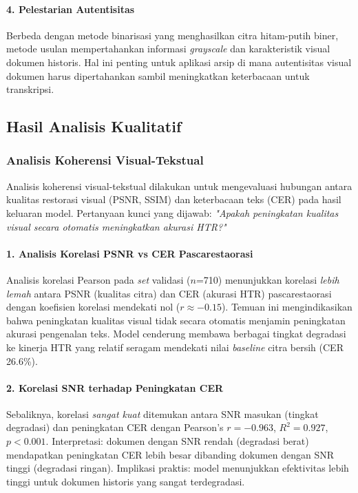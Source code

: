 \documentclass[12pt,a4paper]{article}
\begin{document}
\paragraph{4. Pelestarian Autentisitas}
Berbeda dengan metode binarisasi yang menghasilkan citra hitam-putih biner, metode usulan mempertahankan informasi \textit{grayscale} dan karakteristik visual dokumen historis. Hal ini penting untuk aplikasi arsip di mana autentisitas visual dokumen harus dipertahankan sambil meningkatkan keterbacaan untuk transkripsi.

\vspace{0.8em}

\subsection{Hasil Analisis Kualitatif}
\label{subsec:hasil-kualitatif}
\vspace{0.8em}

\subsubsection{Analisis Koherensi Visual-Tekstual}
\label{subsubsec:koherensi-visual-tekstual}

Analisis koherensi visual-tekstual dilakukan untuk mengevaluasi hubungan antara kualitas restorasi visual (PSNR, SSIM) dan keterbacaan teks (CER) pada hasil keluaran model. Pertanyaan kunci yang dijawab: \textit{"Apakah peningkatan kualitas visual secara otomatis meningkatkan akurasi HTR?"}

\paragraph{1. Analisis Korelasi PSNR vs CER Pascarestaorasi}
Analisis korelasi Pearson pada \textit{set} validasi ($n$=710) menunjukkan korelasi \textit{lebih lemah} antara PSNR (kualitas citra) dan CER (akurasi HTR) pascarestaorasi dengan koefisien korelasi mendekati nol ($r \approx -0.15$). Temuan ini mengindikasikan bahwa peningkatan kualitas visual tidak secara otomatis menjamin peningkatan akurasi pengenalan teks. Model cenderung membawa berbagai tingkat degradasi ke kinerja HTR yang relatif seragam mendekati nilai \textit{baseline} citra bersih (CER 26.6\%).

\paragraph{2. Korelasi SNR terhadap Peningkatan CER}
Sebaliknya, korelasi \textit{sangat kuat} ditemukan antara SNR masukan (tingkat degradasi) dan peningkatan CER dengan Pearson's $r = -0.963$, $R^2 = 0.927$, $p < 0.001$. Interpretasi: dokumen dengan SNR rendah (degradasi berat) mendapatkan peningkatan CER lebih besar dibanding dokumen dengan SNR tinggi (degradasi ringan). Implikasi praktis: model menunjukkan efektivitas lebih tinggi untuk dokumen historis yang sangat terdegradasi.
\end{document}
